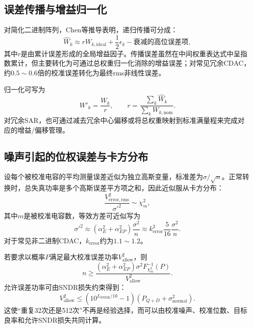\documentclass[UTF8,a4paper,11pt]{ctexart}
\begin{document}
\subsection{误差传播与增益归一化}

对简化二进制阵列，Chen等推导表明，递归传播可分成：
\begin{equation}
\widehat W_k\approx rW_{k,\mathrm{ideal}}+\frac{1}{2}\epsilon_k-\text{衰减的高位误差项},
\label{eq:prop_summary}
\end{equation}
其中$r$是由累计误差形成的全局增益因子。传播误差虽然在中间权重表达式中呈指数累计，但主要转化为可通过总权重归一化消除的增益误差；对常见冗余CDAC，约$0.5\sim0.6$倍的校准误差转化为最终rms非线性误差。\cite{chen2024}

归一化可写为
\begin{equation}
W'_k=\frac{W_k}{r},
\qquad
r=\frac{\sum_k\widehat W_k}{\sum_kW_{k,\mathrm{nom}}}.
\label{eq:weight_normalize}
\end{equation}
对冗余SAR，也可通过减去冗余中心偏移或将总权重映射到标准满量程来完成对应的增益/偏移管理。

\subsection{噪声引起的位权误差与卡方分布}

设每个被校准电容的平均测量误差近似为独立高斯变量，标准差为$\sigma/\sqrt n$。正常转换时，总失真功率是多个高斯误差平方项之和，因此近似服从卡方分布：
\begin{equation}
\frac{V_{\mathrm{error,rms}}^2}{\sigma'^2}\sim\chi_m^2,
\label{eq:chi_square}
\end{equation}
其中$m$是被校准电容数，等效方差可近似写为
\begin{equation}
\sigma'^2\approx(\alpha_E^2+\alpha_{EP}^2)\frac{\sigma^2}{n}
\approx k_{\mathrm{error}}^2\frac{5}{16}\frac{\sigma^2}{n}.
\end{equation}
对于常见非二进制CDAC，$k_{\mathrm{error}}$约为$1.1\sim1.2$。\cite{chen2024}

若要求以概率$P$满足最大校准误差功率$V_{\mathrm{allow}}^2$，则
\begin{equation}
n\ge
\frac{(\alpha_E^2+\alpha_{EP}^2)\sigma^2
F^{-1}_{\chi_m^2}(P)}{V_{\mathrm{allow}}^2}.
\label{eq:n_required}
\end{equation}
允许误差功率可由SNDR损失约束得到：
\begin{equation}
V_{\mathrm{allow}}^2\le
\left(10^{L_{\mathrm{SNDR}}/10}-1\right)
\left(P_{Q+D}+\sigma_{\mathrm{normal}}^2\right).
\end{equation}
这使“重复32次还是512次”不再是经验选择，而可以由校准噪声、校准位数、目标良率和允许SNDR损失共同计算。
\end{document}
